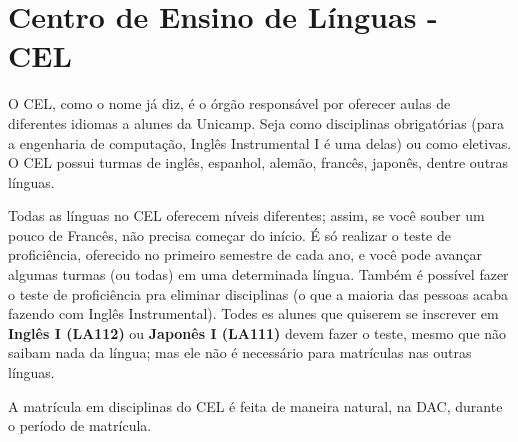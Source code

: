 \section{Centro de Ensino de Línguas - CEL}

O CEL, como o nome já diz, é o órgão responsável por oferecer aulas de diferentes  idiomas a alunes da Unicamp. Seja como disciplinas obrigatórias (para a engenharia de  computação, Inglês Instrumental I é uma delas) ou como eletivas. O CEL possui turmas  de inglês, espanhol, alemão, francês, japonês, dentre outras línguas.

Todas as línguas no CEL oferecem níveis diferentes; assim, se você souber um pouco  de Francês, não precisa começar do início. É só realizar o teste de proficiência, oferecido  no primeiro semestre de cada ano, e você pode avançar algumas turmas (ou todas) em  uma determinada língua. Também é possível fazer o teste de proficiência pra eliminar  disciplinas (o que a maioria das pessoas acaba fazendo com Inglês Instrumental). Todes  es alunes que quiserem se inscrever em \textbf{Inglês I (LA112)} ou \textbf{Japonês I (LA111)} devem  fazer o teste, mesmo que não saibam nada da língua; mas ele não é necessário para  matrículas nas outras línguas. 

A matrícula em disciplinas do CEL é feita de maneira natural, na DAC, durante o  período de matrícula. 
